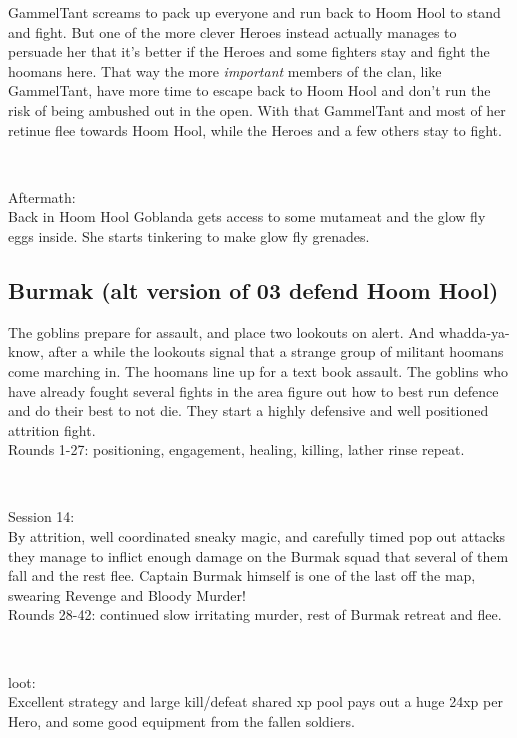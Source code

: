 GammelTant screams to pack up everyone and run back to Hoom Hool to stand and fight. But one of the more clever Heroes instead actually manages to persuade her that it's better if the Heroes and some fighters stay and fight the hoomans here. That way the more \emph{important} members of the clan, like GammelTant, have more time to escape back to Hoom Hool and don't run the risk of being ambushed out in the open.
With that GammelTant and most of her retinue flee towards Hoom Hool, while the Heroes and a few others stay to fight.

\

Aftermath:\\
Back in Hoom Hool Goblanda gets access to some mutameat and the glow fly eggs inside. She starts tinkering to make glow fly grenades.


\subsection*{Burmak (alt version of 03 defend Hoom Hool)}

The goblins prepare for assault, and place two lookouts on alert. And whadda-ya-know, after a while the lookouts signal that a strange group of militant hoomans come marching in. The hoomans line up for a text book assault. The goblins who have already fought several fights in the area figure out how to best run defence and do their best to not die. They start a highly defensive and well positioned attrition fight.\\
Rounds 1-27: positioning, engagement, healing, killing, lather rinse repeat.

\

Session 14:\\
By attrition, well coordinated sneaky magic, and carefully timed pop out attacks they manage to inflict enough damage on the Burmak squad that several of them fall and the rest flee. Captain Burmak himself is one of the last off the map, swearing Revenge and Bloody Murder!\\
Rounds 28-42: continued slow irritating murder, rest of Burmak retreat and flee.

\

loot:\\
Excellent strategy and large kill/defeat shared xp pool pays out a huge 24xp per Hero, and some good equipment from the fallen soldiers.




